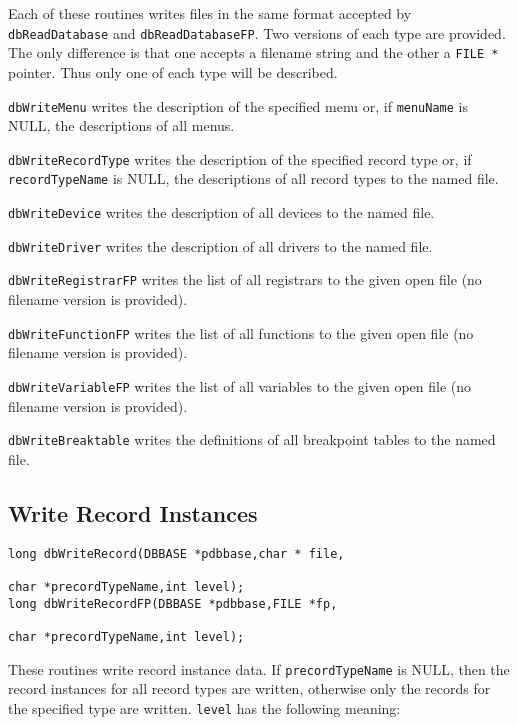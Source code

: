 Each of these routines writes files in the same format accepted by \verb|dbReadDatabase| and \verb|dbReadDatabaseFP|.
Two versions of each type are provided.
The only difference is that one accepts a filename string and the other a \verb|FILE *| pointer.
Thus only one of each type will be described.

\verb|dbWriteMenu| writes the description of the specified menu or, if \verb|menuName| is NULL, the descriptions of all menus.

\verb|dbWriteRecordType| writes the description of the specified record type or, if \verb|recordTypeName| is NULL, the 
descriptions of all record types to the named file.

\verb|dbWriteDevice| writes the description of all devices to the named file.

\verb|dbWriteDriver| writes the description of all drivers to the named file.

\verb|dbWriteRegistrarFP| writes the list of all registrars to the given open file (no filename version is provided).

\verb|dbWriteFunctionFP| writes the list of all functions to the given open file (no filename version is provided).

\verb|dbWriteVariableFP| writes the list of all variables to the given open file (no filename version is provided).

\verb|dbWriteBreaktable| writes the definitions of all breakpoint tables to the named file.

\subsection{Write Record Instances}

\begin{verbatim}
long dbWriteRecord(DBBASE *pdbbase,char * file,

char *precordTypeName,int level);
long dbWriteRecordFP(DBBASE *pdbbase,FILE *fp,

char *precordTypeName,int level);
\end{verbatim}

These routines write record instance data.
If \verb|precordTypeName| is NULL, then the record instances for all record types are written, otherwise only the records for the specified type are written.
\verb|level| has the following meaning:

